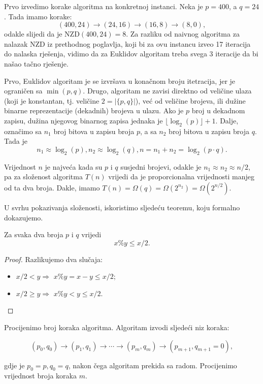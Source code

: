 \begin{example}
	Prvo izvedimo korake algoritma na konkretnoj instanci. Neka je $p=400$, a $q=24$. Tada imamo korake:
	$$(400, 24) \rightarrow (24, 16) \rightarrow (16, 8) \rightarrow (8, 0),$$
	odakle slijedi da je NZD$(400, 24)=8$. Za razliku od naivnog algoritma za nalazak NZD iz prethodnog poglavlja, koji bi za ovu instancu izveo 17 iteracija do nalaska rješenja, vidimo da za Euklidov algoritam treba svega 3 iteracije da bi našao tačno rješenje. 
	
	Prvo, Euklidov algoritam je se izvršava u konačnom broju itetracija, jer je ograničen sa $\min(p, q)$. Drugo, algoritam ne zavisi direktno od veličine ulaza (koji je konstantan, tj. veličine $2=|\{p, q\}|$), već od veličine brojeva, ili dužine binarne reprezentacije (dekadnih) brojeva u ulazu. Ako je $p$ broj u dekadnom zapisu, dužina njegovog binarnog zapisa jednaka je $\lfloor \log_2(p) \rfloor+1$. Dalje, označimo sa $n_1$   broj bitova u zapisu broja $p$, a sa $n_2$  broj bitova u zapisu broja $q$. 
	Tada je
	$$n_1 \approx \log_2(p), n_2 \approx \log_2(q),  n = n_1 + n_2 = \log_2(p \cdot q ).$$
	
	Vrijednost $n$ je najveća kada su $p$ i $q$ susjedni brojevi, odakle je $ n_1 \approx n_2 \approx n/2$,  pa za složenost algoritma $T(n)$ vrijedi da je proporcionalna vrijednosti manjeg od
	ta dva broja.  
	Dakle, imamo $T(n)  = \Omega(q) = \Omega(2^{n_2}) =  \Omega(2^{n/2})$.
	
	U svrhu pokazivanja složenosti, iskoristimo sljedeću teoremu, koju formalno dokazujemo. 
	\begin{theorem}
		 Za svaka dva broja $p$ i $q$ vrijedi
		 $$ x \% y \leq x / 2.$$
	\end{theorem}
	 
	 \begin{proof}
	 	Razlikujemo dva slučaja:
	 	\begin{itemize}
	 		\item $x/2 < y \Rightarrow$  $x\%y = x  - y  \leq x/2 $;
            \item $x/2 \geq  y\Rightarrow$ $x\% y < y \leq x / 2$.
	 	\end{itemize}
	 \end{proof}
	
Procijenimo broj koraka algoritma. Algoritam izvodi sljedeći niz koraka:

$$(p_0,  q_0 ) \rightarrow (p_1, q_1) \rightarrow \cdots \rightarrow (p_m,q_m ) \rightarrow (p_{m+1}, q_{m+1}=0),$$	
	
	gdje je $p_0 = p, q_0 = q$, nakon čega algoritam prekida sa radom. Procijenimo vrijednost broja koraka $m$. 
	

\end{example}
